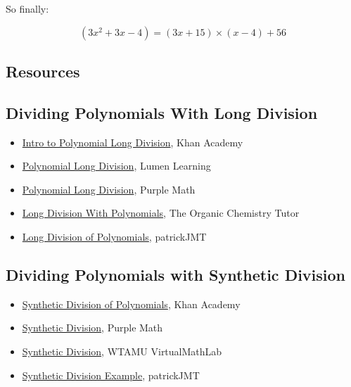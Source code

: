 So finally:

\[
(3x^2 + 3x - 4) = (3x + 15) \times (x - 4) + 56
\]

\subsection{Resources}
\label{sss:reso-55b5}

\subsection{Dividing Polynomials With Long Division}
\label{sss:divi-5583}

\begin{itemize}
    \item \href{https://www.khanacademy.org/math/algebra2/x2ec2f6f830c9fb89:poly-div/x2ec2f6f830c9fb89:quad-div-by-linear/v/polynomial-division}{Intro to Polynomial Long Division}, Khan Academy
    \item \href{https://courses.lumenlearning.com/waymakercollegealgebra/chapter/polynomial-long-division/}{Polynomial Long Division}, Lumen Learning
    \item \href{https://www.purplemath.com/modules/polydiv2.htm}{Polynomial Long Division}, Purple Math
    \item \href{https://www.youtube.com/watch?v=_FSXJmESFmQ}{Long Division With Polynomials}, The Organic Chemistry Tutor
    \item \href{https://www.youtube.com/watch?v=l6_ghhd7kwQ}{Long Division of Polynomials}, patrickJMT
\end{itemize}

\subsection{Dividing Polynomials with Synthetic Division}
\label{sss:divi-32bb}

\begin{itemize}
    \item \href{https://www.khanacademy.org/math/algebra-home/alg-polynomials/alg-synthetic-division-of-polynomials/v/synthetic-division}{Synthetic Division of Polynomials}, Khan Academy
    \item \href{https://www.purplemath.com/modules/synthdiv.htm}{Synthetic Division}, Purple Math
    \item \href{https://www.wtamu.edu/academic/anns/mps/math/mathlab/col_algebra/col_alg_tut37_syndiv.htm}{Synthetic Division}, WTAMU VirtualMathLab
    \item \href{https://www.youtube.com/watch?v=bZoMz1Cy1T4}{Synthetic Division Example}, patrickJMT
\end{itemize}

